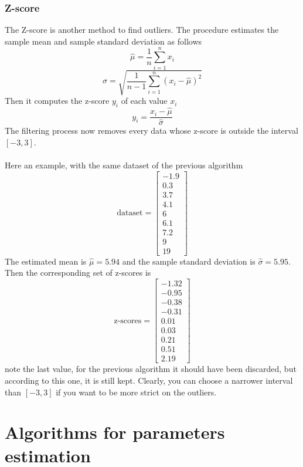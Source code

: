 \documentclass[12pt]{report}
\begin{document}
\subsection{Z-score}
The Z-score is another method to find outliers. The procedure estimates the sample mean and sample standard deviation as follows
\begin{equation}
    \hat{\mu}=\frac{1}{n}\sum_{i=1}^nx_i
\end{equation}
\begin{equation}
    \hat{\sigma}=\sqrt{\frac{1}{n-1}\sum_{i=1}^n(x_i-\hat{\mu})^2}
\end{equation}
Then it computes the z-score $y_i$ of each value $x_i$
\begin{equation}
    y_i=\frac{x_i-\hat{\mu}}{\hat{\sigma}}
\end{equation}
The filtering process now removes every data whose z-score is outside the interval $[-3,3]$. \\\\
Here an example, with the same dataset of the previous algorithm
$$
\text{dataset}=\begin{bmatrix}
-1.9\\ 
0.3\\ 
3.7\\
4.1\\
6\\
6.1\\
7.2\\
9\\
19
\end{bmatrix}
$$
The estimated mean is $\hat{\mu}=5.94$ and the sample standard deviation is $\hat{\sigma}=5.95$. Then the corresponding set of z-scores is
$$
\text{z-scores}=\begin{bmatrix}
-1.32\\
-0.95\\
-0.38\\
-0.31\\
0.01\\
0.03\\
0.21\\
0.51\\
2.19
\end{bmatrix}
$$
note the last value, for the previous algorithm it should have been discarded, but according to this one, it is still kept. Clearly, you can choose a narrower interval than $[-3,3]$ if you want to be more strict on the outliers.

\clearpage

\chapter{Algorithms for parameters estimation}
\end{document}
